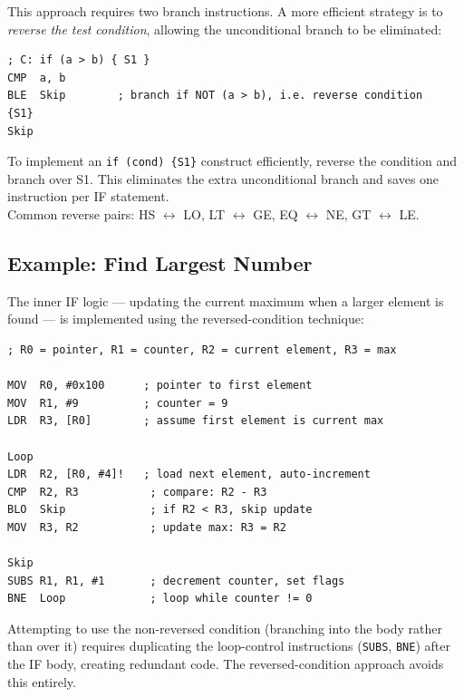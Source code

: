 \documentclass[11pt, a4paper, notitlepage]{report}
\theoremstyle{definition}
\theoremstyle{remark}
\theoremstyle{definition}
\begin{document}
This approach requires two branch instructions. A more efficient strategy is to \emph{reverse the test condition}, allowing the unconditional branch to be eliminated:

\begin{lstlisting}
; C: if (a > b) { S1 }
CMP  a, b
BLE  Skip        ; branch if NOT (a > b), i.e. reverse condition
{S1}
Skip
\end{lstlisting}

\begin{keyresult}[title={Reversing the IF Condition}]
To implement an \texttt{if (cond) \{S1\}} construct efficiently, reverse the condition and branch over S1. This eliminates the extra unconditional branch and saves one instruction per IF statement.\\
Common reverse pairs: HS $\leftrightarrow$ LO, LT $\leftrightarrow$ GE, EQ $\leftrightarrow$ NE, GT $\leftrightarrow$ LE\@.
\end{keyresult}

\subsection{Example: Find Largest Number}

The inner IF logic --- updating the current maximum when a larger element is found --- is implemented using the reversed-condition technique:

\begin{lstlisting}
; R0 = pointer, R1 = counter, R2 = current element, R3 = max

MOV  R0, #0x100      ; pointer to first element
MOV  R1, #9          ; counter = 9
LDR  R3, [R0]        ; assume first element is current max

Loop
LDR  R2, [R0, #4]!   ; load next element, auto-increment
CMP  R2, R3           ; compare: R2 - R3
BLO  Skip             ; if R2 < R3, skip update
MOV  R3, R2           ; update max: R3 = R2

Skip
SUBS R1, R1, #1       ; decrement counter, set flags
BNE  Loop             ; loop while counter != 0
\end{lstlisting}

\begin{warning}[title={Avoiding Reversion Introduces Redundancy}]
Attempting to use the non-reversed condition (branching into the body rather than over it) requires duplicating the loop-control instructions (\texttt{SUBS}, \texttt{BNE}) after the IF body, creating redundant code. The reversed-condition approach avoids this entirely.
\end{warning}
\end{document}
